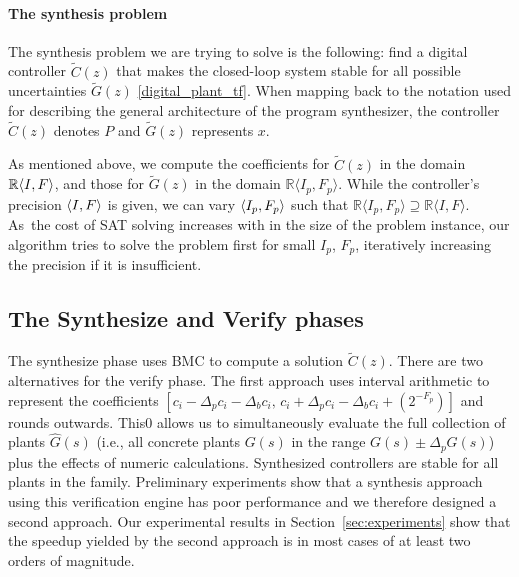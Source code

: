 \documentclass[final]{sig-alternate-05-2015}
\newcommand{\red}[1]{{\color{red}#1}}
\begin{document}

\paragraph{The synthesis problem}
The synthesis problem we are trying to solve is the following:
find a digital controller $\tilde C(z)$ %
that makes the closed-loop system stable 
for all possible uncertainties 
$\tilde G(z)$ \eqref{digital_plant_tf}.
When mapping back to the notation used for describing the general architecture 
of the program synthesizer, the controller $\tilde C(z)$ denotes $P$ and 
$\tilde G(z)$ represents $x$. 

As mentioned above, we compute the coefficients for $\tilde C(z)$ 
in the domain $\mathbb{R}\langle{I},{F}\rangle$, 
and those for $\tilde G(z)$ in the domain
$\mathbb{R}\langle I_p,F_p \rangle$.
While the controller's precision $\langle{I},{F}\rangle$ is given, 
we can vary $\langle{I_p},{F_p}\rangle$ such that 
$\mathbb{R}\langle I_p,F_p \rangle \supseteq \mathbb{R}\langle I,F \rangle$.
%
As~the cost of SAT solving increases with in the size of the problem
instance, our algorithm tries to solve the problem first for small $I_p$,
$F_p$, iteratively increasing the precision if it is insufficient.

\subsection{The {\sc Synthesize} and {\sc Verify} phases}

The {\sc synthesize} phase uses BMC to compute a solution $\tilde C(z)$. 
There are two alternatives for the {\sc verify} phase.  The first approach
uses interval arithmetic \cite{moore1966interval} to represent the
coefficients $[{c}_i-\Delta_p{c}_i-\Delta_b{c}_i,\,\allowbreak
{c}_i+\Delta_p{c}_i-\Delta_b{c}_i+(2^{-F_p})]$ and rounds outwards.  This0
allows us to simultaneously evaluate the full collection of plants
$\hat{G}(s)$ (i.e., all concrete plants $G(s)$ in the range $G(s) \pm
\Delta_pG(s)$) plus the effects of numeric calculations.  Synthesized
controllers are stable for all plants in the family.  Preliminary
experiments show that a synthesis approach using this verification engine
has poor performance and we therefore designed a second approach.  Our
experimental results in Section~\ref{sec:experiments} show that the speedup
yielded by the second approach is in most cases of at least two orders of
magnitude.
\end{document}
